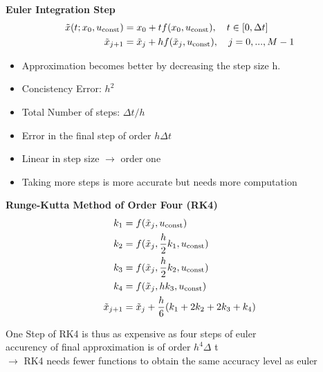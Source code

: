 \begin{tcolorbox}[colback=green!5!white,colframe=green!75!black,title=\textbf{Numerical Integration Methods}]
	
	\textbf{Euler Integration Step}
	\begin{align*}
	\tilde{x}(t; x_0, u_\mathrm{const}) &= x_0 + t f(x_0, u_\mathrm{const}), \quad t \in [0, \Delta t]\\
	\tilde{x}_{j+1} &= \tilde{x}_j + h f (\tilde{x}_j, u_\mathrm{const}), \quad j = 0, ..., M - 1
	\end{align*}
	\begin{itemize}
		\item Approximation becomes better by decreasing the step size h.
		\item Concistency Error: $h^2$
		\item Total Number of steps: $\Delta t / h$
		\item Error in the final step of order $h \Delta t$
		\item Linear in step size $\rightarrow$ order one
		\item Taking more steps is more accurate but needs more computation
	\end{itemize}
	
	\textbf{Runge-Kutta Method of Order Four (RK4)}
	\begin{align*}
		k_1 &= f(\tilde{x}_j, u_\mathrm{const})\\
		k_2 &= f(\tilde{x}_j, \frac{h}{2} k_1, u_\mathrm{const})\\
		k_3 &= f(\tilde{x}_j, \frac{h}{2} k_2, u_\mathrm{const})\\
		k_4 &= f(\tilde{x}_j, h k_3, u_\mathrm{const})\\
		\tilde{x}_{j+1} &= \tilde{x}_j + \frac{h}{6} (k_1 + 2k_2 + 2k_3 + k_4)
	\end{align*}
	
	One Step of RK4 is thus as expensive as four steps of euler\\
	accurency of final approximation is of order $h^4 \Delta$ t\\
	$\rightarrow$ RK4 needs fewer functions to obtain the same accuracy level as euler
\end{tcolorbox}

